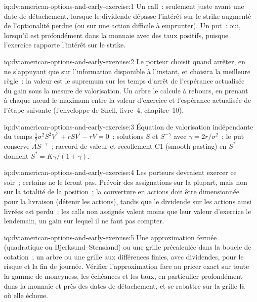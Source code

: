 \begin{solution}{iq:dv:american-options-and-early-exercise:1}
Un call~: seulement juste avant une date de détachement, lorsque le dividende dépasse l'intérêt sur le
strike augmenté de l'optionalité perdue (ou sur une action difficile à emprunter). Un put~: oui, lorsqu'il est profondément dans la
monnaie avec des taux positifs, puisque l'exercice rapporte l'intérêt sur le strike.
\end{solution}

\begin{solution}{iq:dv:american-options-and-early-exercise:2}
Le porteur choisit quand arrêter, en ne s'appuyant que sur l'information disponible à l'instant, et
choisira la meilleure règle~: la valeur est le supremum sur les temps d'arrêt de l'espérance actualisée
du gain sous la mesure de valorisation. Un arbre le calcule à rebours, en prenant à chaque nœud
le maximum entre la valeur d'exercice et l'espérance actualisée de l'étape suivante
(l'enveloppe de Snell, livre~4, chapitre~10).
\end{solution}

\begin{solution}{iq:dv:american-options-and-early-exercise:3}
Équation de valorisation indépendante du temps $\tfrac12\sigma^2S^2V^{\prime\prime}+rSV^{\prime}-rV=0$~; solutions $S$ et
$S^{-\gamma}$ avec $\gamma=2r/\sigma^2$~; le put conserve $AS^{-\gamma}$~; raccord de valeur et
recollement C1 (smooth pasting) en $S^*$ donnent $S^*=K\gamma/(1+\gamma)$.
\end{solution}

\begin{solution}{iq:dv:american-options-and-early-exercise:4}
Les porteurs devraient exercer ce soir~; certains ne le feront pas. Prévoir des assignations sur la plupart, mais non sur la totalité de la
position~; la couverture en actions doit être dimensionnée pour la livraison (détenir les actions), tandis que le dividende
sur les actions ainsi livrées est perdu~; les calls non assignés valent moins que leur
valeur d'exercice le lendemain, un gain sur lequel il ne faut pas compter.
\end{solution}

\begin{solution}{iq:dv:american-options-and-early-exercise:5}
Une approximation fermée (quadratique ou Bjerksund--Stensland) ou une grille précalculée dans
la boucle de cotation~; un arbre ou une grille aux différences finies, avec dividendes, pour le risque et la fin de
journée. Vérifier l'approximation face au pricer exact sur toute la gamme de moneyness,
les échéances et les taux, en particulier profondément dans la monnaie et près des dates de détachement, et se rabattre sur la
grille là où elle échoue.
\end{solution}

